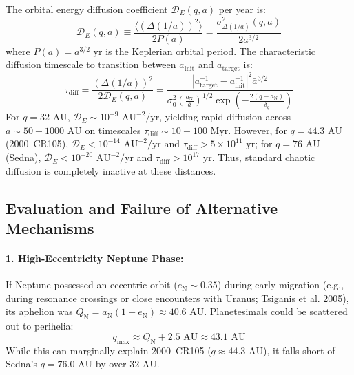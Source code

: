 \documentclass[11pt,a4paper]{article}
\begin{document}
The orbital energy diffusion coefficient $\mathcal{D}_E(q, a)$ per year is:
\begin{equation}
\mathcal{D}_E(q, a) \equiv \frac{\langle (\Delta(1/a))^2 \rangle}{2 P(a)} = \frac{\sigma_{\Delta(1/a)}^2(q, a)}{2 a^{3/2}}
\end{equation}
where $P(a) = a^{3/2}\text{ yr}$ is the Keplerian orbital period. The characteristic diffusion timescale to transition between $a_{\text{init}}$ and $a_{\text{target}}$ is:
\begin{equation}
\tau_{\text{diff}} = \frac{(\Delta(1/a))^2}{2 \mathcal{D}_E(q, \bar{a})} = \frac{|a_{\text{target}}^{-1} - a_{\text{init}}^{-1}|^2 \bar{a}^{3/2}}{\sigma_0^2 \left(\frac{a_{\text{N}}}{\bar{a}}\right)^{1/2} \exp\left(-\frac{2(q - a_{\text{N}})}{\delta_q}\right)}
\end{equation}
For $q = 32\text{ AU}$, $\mathcal{D}_E \sim 10^{-9}\text{ AU}^{-2}/\text{yr}$, yielding rapid diffusion across $a \sim 50-1000\text{ AU}$ on timescales $\tau_{\text{diff}} \sim 10-100\text{ Myr}$. However, for $q = 44.3\text{ AU}$ (2000~CR105), $\mathcal{D}_E < 10^{-14}\text{ AU}^{-2}/\text{yr}$ and $\tau_{\text{diff}} > 5 \times 10^{11}\text{ yr}$; for $q = 76\text{ AU}$ (Sedna), $\mathcal{D}_E < 10^{-20}\text{ AU}^{-2}/\text{yr}$ and $\tau_{\text{diff}} > 10^{17}\text{ yr}$. Thus, standard chaotic diffusion is completely inactive at these distances.

\subsection{Evaluation and Failure of Alternative Mechanisms}
\paragraph{1. High-Eccentricity Neptune Phase:} If Neptune possessed an eccentric orbit ($e_{\text{N}} \sim 0.35$) during early migration (e.g., during resonance crossings or close encounters with Uranus; Tsiganis et al. 2005), its aphelion was $Q_{\text{N}} = a_{\text{N}}(1 + e_{\text{N}}) \approx 40.6\text{ AU}$. Planetesimals could be scattered out to perihelia:
\begin{equation}
q_{\text{max}} \approx Q_{\text{N}} + 2.5\text{ AU} \approx 43.1\text{ AU}
\end{equation}
While this can marginally explain 2000~CR105 ($q \approx 44.3\text{ AU}$), it falls short of Sedna's $q = 76.0\text{ AU}$ by over $32\text{ AU}$.
\end{document}
